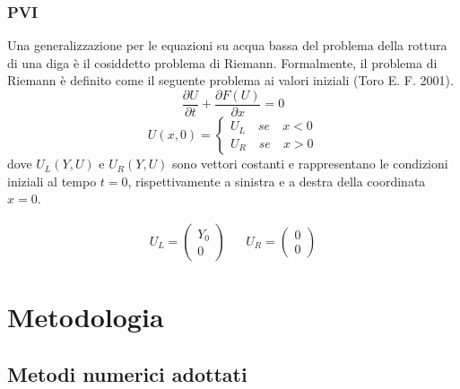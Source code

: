 \documentclass[12pt]{article} %
\begin{document}
\subsubsection{PVI}
\noindent Una generalizzazione per le equazioni su acqua bassa del problema della rottura di una diga è il cosiddetto problema di Riemann. Formalmente, il problema di Riemann è definito come il seguente problema ai valori iniziali (Toro E. F. 2001).
\begin{equation}
    \frac{\partial U}{\partial t}+\frac{\partial F(U)}{\partial x}=0
    \label{eqn:Riemann}
\end{equation}
\begin{equation}
    U(x,0)=\begin{cases}U_L\quad se\quad x<0\\
    U_R\quad se\quad x>0
    \end{cases}
    \label{eqn:Riemann_cond_iniziali}
\end{equation}
\noindent dove $U_L(Y,U)$ e $U_R(Y,U)$ sono vettori costanti e rappresentano le condizioni iniziali al tempo $t=0$, rispettivamente a sinistra e a destra della coordinata $x=0$.

\begin{align*}
    U_L=\begin{pmatrix}
    Y_0\\
    0
    \end{pmatrix}&&
    U_R=\begin{pmatrix}
   0\\
   0
   \end{pmatrix}
\end{align*}


\newpage
\section{Metodologia}
\subsection{Metodi numerici adottati}
\end{document}
